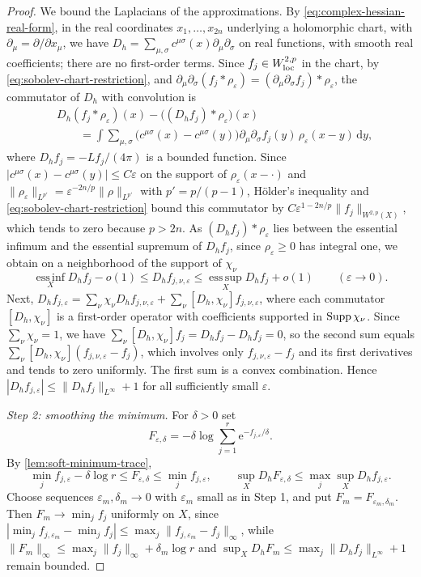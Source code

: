 \begin{proof}
We bound the Laplacians of the approximations. By \eqref{eq:complex-hessian-real-form}, in the real coordinates $x_1,\ldots,x_{2n}$ underlying a holomorphic chart, with $\partial_\mu=\partial/\partial x_\mu$, we have $D_h=\sum_{\mu,\sigma}c^{\mu\sigma}(x)\partial_\mu\partial_\sigma$ on real functions, with smooth real coefficients; there are no first-order terms. Since $f_j\in W^{2,p}_{\mathrm{loc}}$ in the chart, by \eqref{eq:sobolev-chart-restriction}, and $\partial_\mu\partial_\sigma(f_j*\rho_\varepsilon)=(\partial_\mu\partial_\sigma f_j)*\rho_\varepsilon$, the commutator of $D_h$ with convolution is
\[
 \begin{aligned}
 &D_h(f_j*\rho_\varepsilon)(x)-\bigl((D_hf_j)*\rho_\varepsilon\bigr)(x)\\
 &\qquad=\int\sum_{\mu,\sigma}\bigl(c^{\mu\sigma}(x)-c^{\mu\sigma}(y)\bigr)
     \partial_\mu\partial_\sigma f_j(y)\,\rho_\varepsilon(x-y)\,\mathrm dy,
 \end{aligned}
\]
where $D_hf_j=-Lf_j/(4\pi)$ is a bounded function. Since $|c^{\mu\sigma}(x)-c^{\mu\sigma}(y)|\leq C\varepsilon$ on the support of $\rho_\varepsilon(x-\cdot)$ and $\|\rho_\varepsilon\|_{L^{p'}}=\varepsilon^{-2n/p}\|\rho\|_{L^{p'}}$ with $p'=p/(p-1)$, H\"older's inequality and \eqref{eq:sobolev-chart-restriction} bound this commutator by $C\varepsilon^{1-2n/p}\|f_j\|_{W^{2,p}(X)}$, which tends to zero because $p>2n$. As $(D_hf_j)*\rho_\varepsilon$ lies between the essential infimum and the essential supremum of $D_hf_j$, since $\rho_\varepsilon\geq0$ has integral one, we obtain on a neighborhood of the support of $\chi_\nu$
\[
 \operatorname*{ess\,inf}_XD_hf_j-o(1)\leq D_hf_{j,\nu,\varepsilon}
            \leq\operatorname*{ess\,sup}_XD_hf_j+o(1)\qquad(\varepsilon\to0).
\]
Next, $D_hf_{j,\varepsilon}=\sum_\nu\chi_\nu D_hf_{j,\nu,\varepsilon}+\sum_\nu[D_h,\chi_\nu]f_{j,\nu,\varepsilon}$, where each commutator $[D_h,\chi_\nu]$ is a first-order operator with coefficients supported in $\operatorname{Supp}\chi_\nu$. Since $\sum_\nu\chi_\nu=1$, we have $\sum_\nu[D_h,\chi_\nu]f_j=D_hf_j-D_hf_j=0$, so the second sum equals $\sum_\nu[D_h,\chi_\nu](f_{j,\nu,\varepsilon}-f_j)$, which involves only $f_{j,\nu,\varepsilon}-f_j$ and its first derivatives and tends to zero uniformly. The first sum is a convex combination. Hence $|D_hf_{j,\varepsilon}|\leq\|D_hf_j\|_{L^\infty}+1$ for all sufficiently small $\varepsilon$.

\emph{Step 2: smoothing the minimum.} For $\delta>0$ set
\[
 F_{\varepsilon,\delta}
       =-\delta\log\sum_{j=1}^r
                    \mathrm e^{-f_{j,\varepsilon}/\delta}.
\]
By \cref{lem:soft-minimum-trace},
\[
 \min_jf_{j,\varepsilon}-\delta\log r\leq F_{\varepsilon,\delta}\leq\min_jf_{j,\varepsilon},
 \qquad
 \sup_XD_hF_{\varepsilon,\delta}\leq\max_j\sup_XD_hf_{j,\varepsilon}.
\]
Choose sequences $\varepsilon_m,\delta_m\to0$ with $\varepsilon_m$ small as in Step 1, and put $F_m=F_{\varepsilon_m,\delta_m}$. Then $F_m\to\min_jf_j$ uniformly on $X$, since $|\min_jf_{j,\varepsilon_m}-\min_jf_j|\leq\max_j\|f_{j,\varepsilon_m}-f_j\|_\infty$, while $\|F_m\|_\infty\leq\max_j\|f_j\|_\infty+\delta_m\log r$ and $\sup_XD_hF_m\leq\max_j\|D_hf_j\|_{L^\infty}+1$ remain bounded.


\end{proof}
